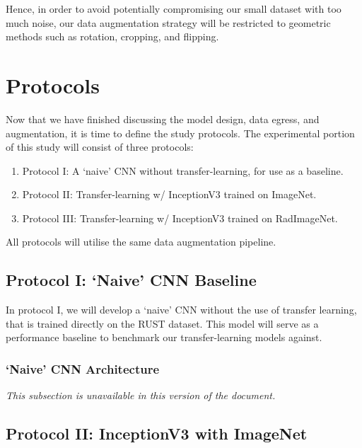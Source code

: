 Hence, in order to avoid potentially compromising our small dataset with too much noise, our data augmentation strategy will be restricted to geometric methods such as rotation, cropping, and flipping.

\clearpage

\section{Protocols}

Now that we have finished discussing the model design, data egress, and augmentation, it is time to define the study protocols. The experimental portion of this study will consist of three protocols:

\begin{enumerate}
    \item Protocol   I: A \enquote*{naive} CNN without transfer-learning, for use as a baseline.
    \item Protocol  II: Transfer-learning w/ InceptionV3 trained on ImageNet.
    \item Protocol III: Transfer-learning w/ InceptionV3 trained on RadImageNet.
\end{enumerate}

\noindent
All protocols will utilise the same data augmentation pipeline.



\subsection{Protocol I: \enquote*{Naive} CNN Baseline}

In protocol I, we will develop a \enquote*{naive} CNN without the use of transfer learning, that is trained directly on the RUST dataset. This model will serve as a performance baseline to benchmark our transfer-learning models against.

\subsubsection{\enquote*{Naive} CNN Architecture}

\emph{This subsection is unavailable in this version of the document.}

\subsection{Protocol II: InceptionV3 with ImageNet}

